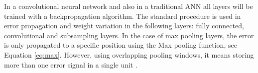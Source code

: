 In a convolutional neural network and also in a traditional ANN all layers will be trained with a backpropagation algorithm. The standard procedure is used in error propagation and weight variation in the following layers: fully connected, convolutional and subsampling layers. In the case of max pooling layers, the error is only propagated to a specific position using the Max pooling function, see Equation \ref{eq:max}. However, using overlapping pooling windows, it means storing more than one error signal in a single unit \cite{EvalPooling}.